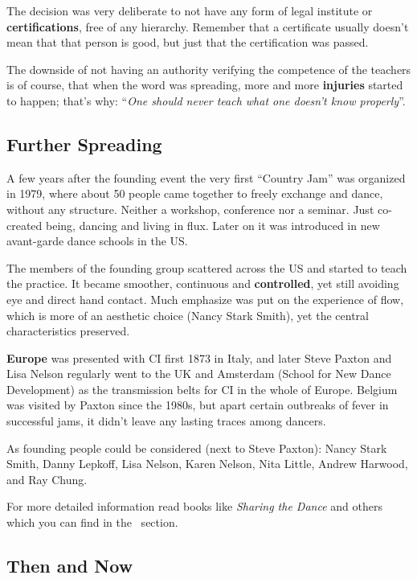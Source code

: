 The decision was very deliberate to not have any form of legal institute or \textbf{certifications}, free of any hierarchy.
Remember that a certificate usually doesn't mean that that person is good, but just that the certification was passed.

The downside of not having an authority verifying the competence of the teachers is of course, that when the word was spreading, more and more \textbf{injuries} started to happen; that's why: ``\textit{One should never teach what one doesn't know properly}''.

\subsection{Further Spreading}\label{subsec:further-spreading}

A few years after the founding event the very first ``Country Jam'' was organized in 1979, where about 50 people came together to freely exchange and dance, without any structure.
Neither a workshop, conference nor a seminar.
Just co-created being, dancing and living in flux.
Later on it was introduced in new avant-garde dance schools in the US\@.

The members of the founding group scattered across the US and started to teach the practice.
It became smoother, continuous and \textbf{controlled}, yet still avoiding eye and direct hand contact.
Much emphasize was put on the experience of flow, which is more of an aesthetic choice (Nancy Stark Smith), yet the central characteristics preserved.

\textbf{Europe} was presented with CI first 1873 in Italy, and later Steve Paxton and Lisa Nelson regularly went to the UK and Amsterdam (School for New Dance Development) as the transmission belts for CI in the whole of Europe.
Belgium was visited by Paxton since the 1980s, but apart certain outbreaks of fever in successful jams, it didn't leave any lasting traces among dancers.

As founding people could be considered (next to Steve Paxton): Nancy Stark Smith, Danny Lepkoff, Lisa Nelson, Karen Nelson, Nita Little, Andrew Harwood, and Ray Chung.

For more detailed information read books like \textit{Sharing the Dance} and others which you can find in the~ section.

\subsection{Then and Now}\label{subsec:then-and-now}

